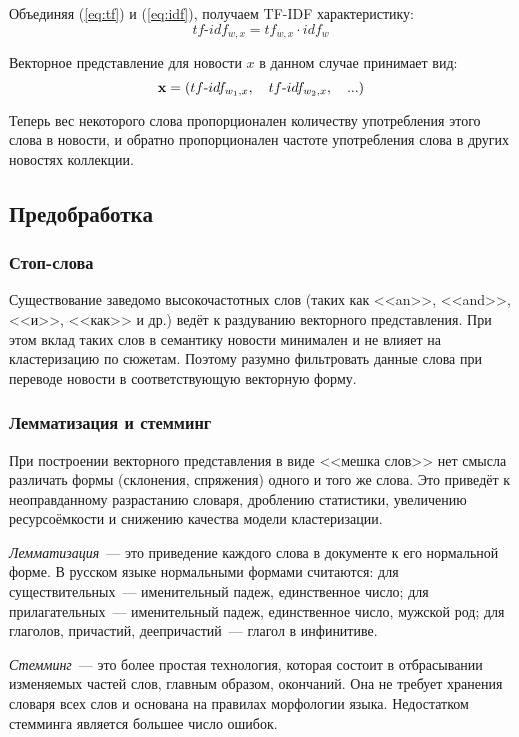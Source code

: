 Объединяя (\ref{eq:tf}) и (\ref{eq:idf}), получаем TF-IDF характеристику:
\begin{equation} \label{eq:tf-idf}
    tf\text{-}idf_{w,x}=tf_{w,x}\cdot idf_w
\end{equation}

Векторное представление для новости $x$ в данном случае принимает вид:
\begin{equation}
    \boldsymbol{\mathbf{x}}=(tf\text{-}idf_{w_1,x}, \quad tf\text{-}idf_{w_2,x}, \quad ...)
\end{equation}

Теперь вес некоторого слова пропорционален количеству употребления этого слова в новости, и обратно пропорционален частоте употребления слова в других новостях коллекции.

\subsection{Предобработка}
\subsubsection{Стоп-слова}
Существование заведомо высокочастотных слов (таких как <<an>>, <<and>>, <<и>>, <<как>> и др.) ведёт к раздуванию векторного представления. При этом вклад таких слов в семантику новости минимален и не влияет на кластеризацию по сюжетам. Поэтому разумно фильтровать данные слова при переводе новости в соответствующую векторную форму.

\subsubsection{Лемматизация и стемминг} \label{sssec:stemming}
При построении векторного представления в виде <<мешка слов>> нет смысла различать формы (склонения, спряжения) одного и того же слова. Это приведёт к неоправданному разрастанию словаря, дроблению статистики, увеличению ресурсоёмкости и снижению качества модели кластеризации.

\emph{Лемматизация}~--- это приведение каждого слова в документе к его нормальной форме. В русском языке нормальными формами считаются: для существительных~--- именительный падеж, единственное число; для прилагательных~--- именительный падеж, единственное число, мужской род; для глаголов, причастий, деепричастий~--- глагол в инфинитиве.

\emph{Стемминг}~--- это более простая технология, которая состоит в отбрасывании изменяемых частей слов, главным образом, окончаний. Она не требует хранения словаря всех слов и основана на правилах морфологии языка. Недостатком стемминга является большее число ошибок.

